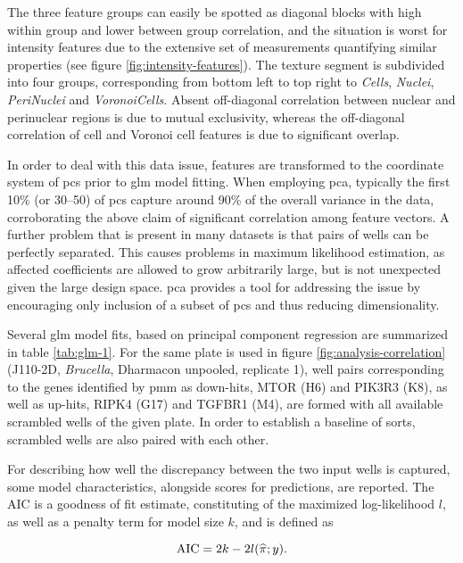 The three feature groups can easily be spotted as diagonal blocks with high within group and lower between group correlation, and the situation is worst for intensity features due to the extensive set of measurements quantifying similar properties (see figure \ref{fig:intensity-features}). The texture segment is subdivided into four groups, corresponding from bottom left to top right to \textit{Cells}, \textit{Nuclei}, \textit{PeriNuclei} and \textit{VoronoiCells}. Absent off-diagonal correlation between nuclear and perinuclear regions is due to mutual exclusivity, whereas the off-diagonal correlation of cell and Voronoi cell features is due to significant overlap.



In order to deal with this data issue, features are transformed to the coordinate system of \glspl{pc} prior to \gls{glm} model fitting. When employing \gls{pca}, typically the first 10\% (or 30--50) of \glspl{pc} capture around 90\% of the overall variance in the data, corroborating the above claim of significant correlation among feature vectors. A further problem that is present in many datasets is that pairs of wells can be perfectly separated. This causes problems in maximum likelihood estimation, as affected coefficients are allowed to grow arbitrarily large, but is not unexpected given the large design space. \Gls{pca} provides a tool for addressing the issue by encouraging only inclusion of a subset of \glspl{pc} and thus reducing dimensionality.

Several \gls{glm} model fits, based on principal component regression are summarized in table \ref{tab:glm-1}. For the same plate is used in figure \ref{fig:analysis-correlation} (J110-2D, \textit{Brucella}, Dharmacon unpooled, replicate 1), well pairs corresponding to the genes identified by \gls{pmm} as down-hits, MTOR (H6) and PIK3R3 (K8), as well as up-hits, RIPK4 (G17) and TGFBR1 (M4), are formed with all available scrambled wells of the given plate. In order to establish a baseline of sorts, scrambled wells are also paired with each other.

For describing how well the discrepancy between the two input wells is captured, some model characteristics, alongside scores for predictions, are reported. The AIC is a goodness of fit estimate, constituting of the maximized log-likelihood $l$, as well as a penalty term for model size $k$, and is defined as

\begin{equation}
  \operatorname{AIC} = 2k - 2l(\widehat{\pi}; y).
\end{equation}

